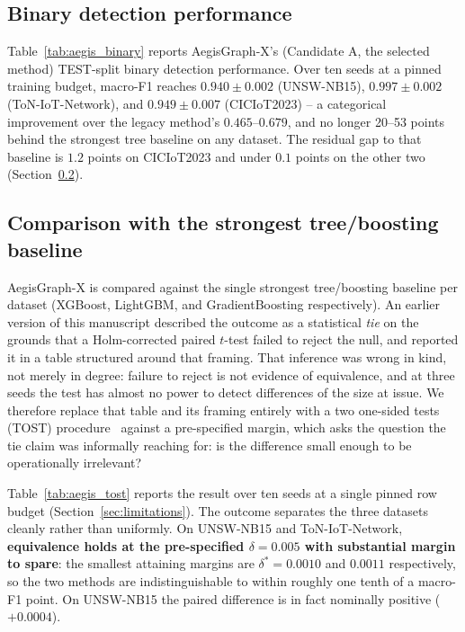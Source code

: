 \documentclass[journal]{IEEEtran}
\begin{document}


\subsection{Binary detection performance}
Table~\ref{tab:aegis_binary} reports AegisGraph-X's (Candidate A, the
selected method) TEST-split binary detection performance. Over ten seeds at a pinned training budget, macro-F1 reaches
$0.940\pm0.002$ (UNSW-NB15), $0.997\pm0.002$ (ToN-IoT-Network), and
$0.949\pm0.007$ (CICIoT2023) -- a categorical improvement over the legacy
method's $0.465$--$0.679$, and no longer 20--53 points behind the strongest
tree baseline on any dataset. The residual gap to that baseline is
$1.2$ points on CICIoT2023 and under $0.1$ points on the other two
(Section~\ref{sec:results_equivalence}).

\subsection{Comparison with the strongest tree/boosting baseline}
\label{sec:results_equivalence}

AegisGraph-X is compared against the single strongest tree/boosting baseline
per dataset (XGBoost, LightGBM, and GradientBoosting respectively). An
earlier version of this manuscript described the outcome as a statistical
\emph{tie} on the grounds that a Holm-corrected paired $t$-test failed to
reject the null, and reported it in a table structured around that framing.
That inference was wrong in kind, not merely in degree: failure to reject is
not evidence of equivalence, and at three seeds the test has almost no power
to detect differences of the size at issue. We therefore replace that table
and its framing entirely with a two one-sided tests (TOST)
procedure~\cite{schuirmann1987tost,lakens2017equivalence} against a
pre-specified margin, which asks the question the tie claim was informally
reaching for: is the difference small enough to be operationally irrelevant?



Table~\ref{tab:aegis_tost} reports the result over ten seeds at a single
pinned row budget (Section~\ref{sec:limitations}). The outcome separates the
three datasets cleanly rather than uniformly. On UNSW-NB15 and
ToN-IoT-Network, \textbf{equivalence holds at the pre-specified
$\delta = 0.005$ with substantial margin to spare}: the smallest attaining
margins are $\delta^{*} = 0.0010$ and $0.0011$ respectively, so the two
methods are indistinguishable to within roughly one tenth of a macro-F1
point. On UNSW-NB15 the paired difference is in fact nominally positive
($+0.0004$).
\end{document}
